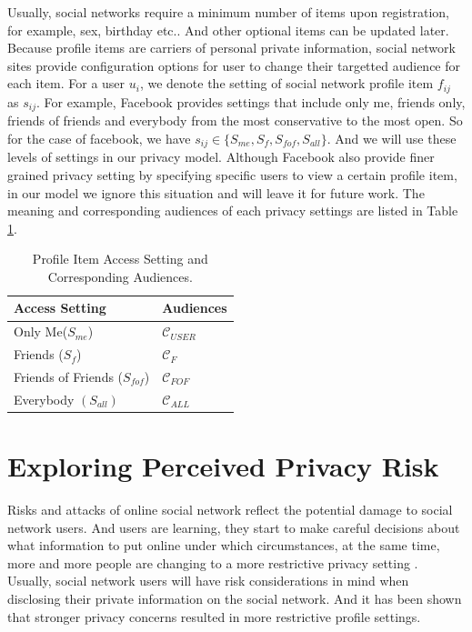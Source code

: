 \documentclass[a4paper]{article}
\begin{document}
Usually, social networks require a minimum number of items upon
registration, for example, sex, birthday etc.. And other optional
items can be updated later. Because profile items are carriers of
personal private information, social network sites provide
configuration options for user to change their targetted audience for
each item. For a user $u_i$, we denote the setting of social network
profile item $f_{ij}$ as $s_{ij}$. For example, Facebook provides
settings that include only me, friends only, friends of friends and
everybody from the most conservative to the most open. So for the case
of facebook, we have $s_{ij}\in \{S_{me},S_f,S_{fof},S_{all}\}$. And
we will use these levels of settings in our privacy model. 
Although Facebook also provide finer grained privacy setting by
specifying specific users to view a certain profile item, in our model
we ignore this situation and will leave it for future work. The
meaning and corresponding audiences of each privacy settings are
listed in Table \ref{tbl:setting}.

\begin{table}[h]
  \centering
  \begin{tabular}{l|l}
    \toprule 
    \textbf{Access Setting} & \textbf{Audiences} \\ \toprule
    Only Me($S_{me}$) & $\mathcal{C}_{USER}$\\ \midrule 
    Friends ($S_f$) & $\mathcal{C}_F$ \\ \midrule 
    Friends of Friends ($S_{fof}$) & $\mathcal{C}_{FOF}$ \\ \midrule 
    Everybody $(S_{all})$ & $\mathcal{C}_{ALL}$ \\ \bottomrule 
  \end{tabular}
  \caption{Profile Item Access Setting and Corresponding Audiences.}
  \label{tbl:setting}
\end{table}

\section{Exploring Perceived Privacy Risk}
Risks and attacks of online social network reflect the potential
damage to social network users. And users are learning, they start to
make careful decisions about what information to put online under
which circumstances, at the same time, more and more people are
changing to a more restrictive privacy setting \cite{socialnet:setting}. 
Usually, social network users will have risk considerations in
mind when disclosing their private information 
on the social network. And it has been shown
\cite{privacy:paradox:revisit} that stronger privacy 
concerns resulted in more restrictive profile settings. 
\end{document}

